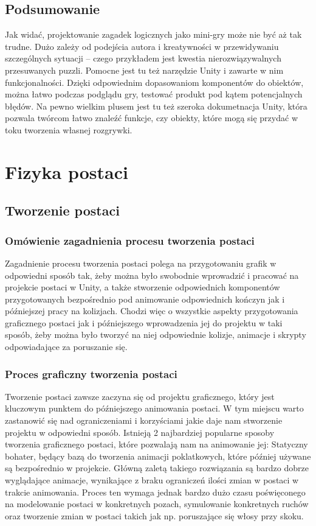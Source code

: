 \documentclass[oneside,polski,logo]{amuthesis}
\begin{document}
\section{Podsumowanie}
\par Jak widać, projektowanie zagadek logicznych jako mini-gry może nie być aż tak trudne. Dużo zależy od podejścia autora i kreatywności w przewidywaniu szczególnych sytuacji – czego przykładem jest kwestia nierozwiązywalnych przesuwanych puzzli. Pomocne jest tu też narzędzie Unity i zawarte w nim funkcjonalności. Dzięki odpowiednim dopasowaniom komponentów do obiektów, można łatwo podczas podglądu gry, testować produkt pod kątem potencjalnych błędów. Na pewno wielkim plusem jest tu też szeroka dokumetnacja Unity, która pozwala twórcom łatwo znaleźć funkcje, czy obiekty, które mogą się przydać w toku tworzenia własnej rozgrywki.

\chapter{Fizyka postaci}
\section{Tworzenie postaci}
\subsection{Omówienie zagadnienia procesu tworzenia postaci}
Zagadnienie procesu tworzenia postaci polega na przygotowaniu grafik w odpowiedni sposób tak, żeby można było swobodnie wprowadzić i pracować na projekcie postaci w Unity, a także stworzenie odpowiednich komponentów przygotowanych bezpośrednio pod animowanie odpowiednich kończyn jak i późniejszej pracy na kolizjach. Chodzi więc o wszystkie aspekty przygotowania graficznego postaci jak i późniejszego wprowadzenia jej do projektu w taki sposób, żeby można było tworzyć na niej odpowiednie kolizje, animacje i skrypty odpowiadające za poruszanie się.
\subsection{Proces graficzny tworzenia postaci}
Tworzenie postaci zawsze zaczyna się od projektu graficznego, który jest kluczowym punktem do późniejszego animowania postaci. W tym miejscu warto zastanowić się nad ograniczeniami i korzyściami jakie daje nam stworzenie projektu w odpowiedni sposób. Istnieją 2 najbardziej popularne sposoby tworzenia graficznego postaci, które pozwalają nam na animowanie jej:
Statyczny bohater, będący bazą do tworzenia animacji poklatkowych, które później używane są bezpośrednio w projekcie. Główną zaletą takiego rozwiązania są bardzo dobrze wyglądające animacje, wynikające z braku ograniczeń ilości zmian w postaci w trakcie animowania.
Proces ten wymaga jednak bardzo dużo czasu poświęconego na modelowanie postaci w konkretnych pozach, symulowanie konkretnych ruchów oraz tworzenie zmian w postaci takich jak np. poruszające się włosy przy skoku.
\end{document}
